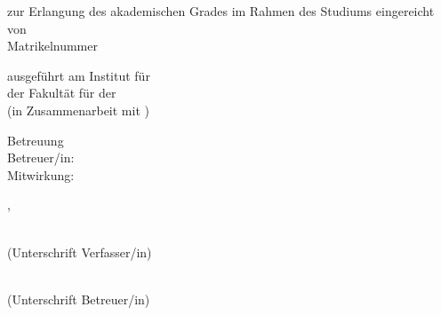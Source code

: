 \begin{titlepage}
\begin{center}
    \vspace{2.25cm}

    \begin{minipage}[t][0.22\paperheight]{\textwidth}
      \centering
      zur Erlangung des akademischen Grades
      \vfill
      {\Large \textbf{\thesisdegree}}
      \vfill
      im Rahmen des Studiums
      \vfill
      {\Large\textbf{\thesisstudies}}
      \vfill
      eingereicht von
      \vfill
      {\Large\textbf{\thesisauthor}}\\[1mm]
      Matrikelnummer~\thesisstudentnumber
    \end{minipage}
               
  \end{center}

  \vfill

  \noindent ausgef\"{u}hrt am Institut f\"{u}r \thesisinstitute\\
  der Fakult\"{a}t f\"{u}r \thesisfaculty{} der \thesisuniversity\\
  (in Zusammenarbeit mit \thesiscollaboration{})

  \vspace{1cm}

  \noindent Betreuung\\
  Betreuer/in: \thesissupervisor{}\\
  Mitwirkung: \thesiscosupervisor{}

  \vspace{1.5cm}
  \noindent \thesisplace{}, \thesisdate \hspace{1cm}%
  \begin{minipage}[t]{5cm}%
    \flushleft%
    \hrulefill\\ (Unterschrift Verfasser/in)%
  \end{minipage}%
  \hspace{1cm}%
  \begin{minipage}[t]{5cm}
    \flushleft%
    \hrulefill\\ (Unterschrift Betreuer/in)%
  \end{minipage}
    
  \endgroup
  
\end{titlepage}
